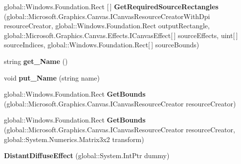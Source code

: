 \begin{DoxyCompactItemize}
global\+::\+Windows.\+Foundation.\+Rect \mbox{[}$\,$\mbox{]} {\bfseries Get\+Required\+Source\+Rectangles} (global\+::\+Microsoft.\+Graphics.\+Canvas.\+I\+Canvas\+Resource\+Creator\+With\+Dpi resource\+Creator, global\+::\+Windows.\+Foundation.\+Rect output\+Rectangle, global\+::\+Microsoft.\+Graphics.\+Canvas.\+Effects.\+I\+Canvas\+Effect\mbox{[}$\,$\mbox{]} source\+Effects, uint\mbox{[}$\,$\mbox{]} source\+Indices, global\+::\+Windows.\+Foundation.\+Rect\mbox{[}$\,$\mbox{]} source\+Bounds)
\item 
\mbox{\label{class_microsoft_1_1_graphics_1_1_canvas_1_1_effects_1_1_distant_diffuse_effect_a6dc57439b132a8d68fdbf24deed274f8}} 
string {\bfseries get\+\_\+\+Name} ()
\item 
\mbox{\label{class_microsoft_1_1_graphics_1_1_canvas_1_1_effects_1_1_distant_diffuse_effect_a793a85913c14d1fd90f31d8419e31304}} 
void {\bfseries put\+\_\+\+Name} (string name)
\item 
\mbox{\label{class_microsoft_1_1_graphics_1_1_canvas_1_1_effects_1_1_distant_diffuse_effect_a1cb8c03778e97d9bc464859b2d31a0f9}} 
global\+::\+Windows.\+Foundation.\+Rect {\bfseries Get\+Bounds} (global\+::\+Microsoft.\+Graphics.\+Canvas.\+I\+Canvas\+Resource\+Creator resource\+Creator)
\item 
\mbox{\label{class_microsoft_1_1_graphics_1_1_canvas_1_1_effects_1_1_distant_diffuse_effect_a285663b04cb7fc7b35148015b81d8e72}} 
global\+::\+Windows.\+Foundation.\+Rect {\bfseries Get\+Bounds} (global\+::\+Microsoft.\+Graphics.\+Canvas.\+I\+Canvas\+Resource\+Creator resource\+Creator, global\+::\+System.\+Numerics.\+Matrix3x2 transform)
\item 
\mbox{\label{class_microsoft_1_1_graphics_1_1_canvas_1_1_effects_1_1_distant_diffuse_effect_a22bc8ecf39b5603009d3e448ec80f51e}} 
{\bfseries Distant\+Diffuse\+Effect} (global\+::\+System.\+Int\+Ptr dummy)
\item 
\mbox{\label{class_microsoft_1_1_graphics_1_1_canvas_1_1_effects_1_1_distant_diffuse_effect_ac2c02091c4129fd0d1920421b4a2d61c}} 

\end{DoxyCompactItemize}
